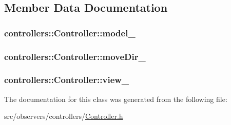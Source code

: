 \subsection{\-Member \-Data \-Documentation}
\hypertarget{classcontrollers_1_1Controller_a4238e40666b91a3f95a9459233037e0b}{
\subsubsection[{model\-\_\-}]{ {\bf controllers\-::\-Controller\-::model\-\_\-}}}\label{d4/d85/classcontrollers_1_1Controller_a4238e40666b91a3f95a9459233037e0b}
\hypertarget{classcontrollers_1_1Controller_a0bd9a0e7a7d6e7ef4ea4861e4e907016}{
\subsubsection[{move\-Dir\-\_\-}]{ {\bf controllers\-::\-Controller\-::move\-Dir\-\_\-}}}\label{d4/d85/classcontrollers_1_1Controller_a0bd9a0e7a7d6e7ef4ea4861e4e907016}
\hypertarget{classcontrollers_1_1Controller_ad15a9e80d35f43a394775ab8292ee561}{
\subsubsection[{view\-\_\-}]{ {\bf controllers\-::\-Controller\-::view\-\_\-}}}\label{d4/d85/classcontrollers_1_1Controller_ad15a9e80d35f43a394775ab8292ee561}


\-The documentation for this class was generated from the following file\-:\begin{DoxyCompactItemize}
\item 
src/observers/controllers/\hyperlink{Controller_8h}{\-Controller.\-h}\end{DoxyCompactItemize}
